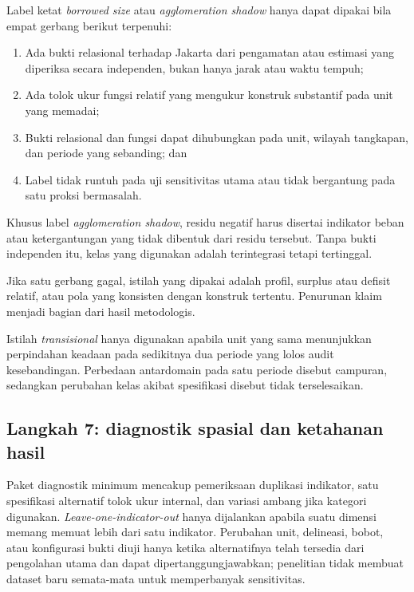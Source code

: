 \documentclass[11pt,a4paper,oneside,openany,indonesian]{report}
\begin{document}
Label ketat \emph{borrowed size} atau \emph{agglomeration shadow} hanya
dapat dipakai bila empat gerbang berikut terpenuhi:

\begin{enumerate}
\def\labelenumi{\arabic{enumi}.}
\tightlist
\item
  Ada bukti relasional terhadap Jakarta dari pengamatan atau estimasi
  yang diperiksa secara independen, bukan hanya jarak atau waktu tempuh;
\item
  Ada tolok ukur fungsi relatif yang mengukur konstruk substantif pada
  unit yang memadai;
\item
  Bukti relasional dan fungsi dapat dihubungkan pada unit, wilayah
  tangkapan, dan periode yang sebanding; dan
\item
  Label tidak runtuh pada uji sensitivitas utama atau tidak bergantung
  pada satu proksi bermasalah.
\end{enumerate}

Khusus label \emph{agglomeration shadow}, residu negatif harus disertai
indikator beban atau ketergantungan yang tidak dibentuk dari residu
tersebut. Tanpa bukti independen itu, kelas yang digunakan adalah
terintegrasi tetapi tertinggal.

Jika satu gerbang gagal, istilah yang dipakai adalah profil,
surplus atau defisit relatif, atau pola yang konsisten dengan konstruk
tertentu. Penurunan klaim menjadi bagian dari hasil
metodologis.

Istilah \emph{transisional} hanya digunakan apabila unit yang sama
menunjukkan perpindahan keadaan pada sedikitnya dua periode yang lolos
audit kesebandingan. Perbedaan antardomain pada satu periode disebut
campuran, sedangkan perubahan kelas akibat spesifikasi disebut tidak
terselesaikan.

\subsection{Langkah 7: diagnostik spasial dan ketahanan
hasil}\label{langkah-7-diagnostik-spasial-dan-ketahanan-hasil}

Paket diagnostik minimum mencakup pemeriksaan duplikasi indikator,
satu spesifikasi alternatif tolok ukur internal, dan variasi ambang jika
kategori digunakan. \emph{Leave-one-indicator-out} hanya dijalankan
apabila suatu dimensi memang memuat lebih dari satu indikator. Perubahan
unit, delineasi, bobot, atau konfigurasi bukti diuji hanya ketika
alternatifnya telah tersedia dari pengolahan utama dan dapat
dipertanggungjawabkan; penelitian tidak membuat dataset baru semata-mata
untuk memperbanyak sensitivitas.
\end{document}
